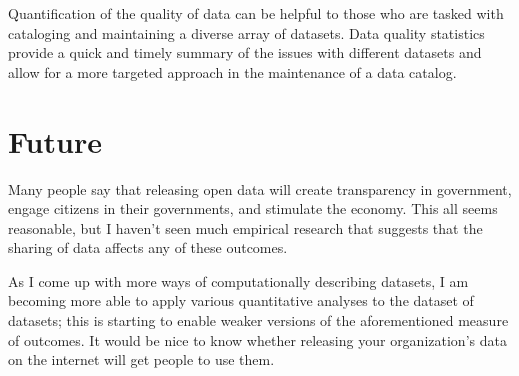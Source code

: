 \documentclass{acm_proc_article-sp}
\begin{document}
Quantification of the quality of data can be helpful to those who are tasked
with cataloging and maintaining a diverse array of datasets. Data quality
statistics provide a quick and timely summary of the issues with different
datasets and allow for a more targeted approach in the maintenance of a
data catalog.

\section{Future}
Many people say that releasing open data will create transparency in government,
engage citizens in their governments, and stimulate the economy. This all seems
reasonable, but I haven't seen much empirical research that suggests that the
sharing of data affects any of these outcomes.

As I come up with more ways of computationally describing datasets, I am becoming
more able to apply various quantitative analyses to the dataset of datasets;
this is starting to enable weaker versions of the aforementioned measure of
outcomes. It would be nice to know whether releasing your organization's data on
the internet will get people to use them.



\balancecolumns
\end{document}
